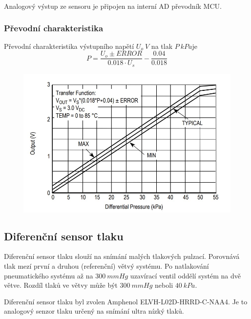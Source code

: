 \documentclass{ctuthesis}
\begin{document}
Analogový výstup ze sensoru je připojen na interní AD převodník MCU. 

\subsubsection{Převodní charakteristika}
Převodní charakteristika výstupního napětí $U_{o} \ V$ na tlak $P \ kPa$je 
\begin{equation}
    P = \frac{U_o \pm ERROR}{0.018 \cdot U_s} - \frac{0.04}{0.018}
    \label{eq:nxp_transfer}
\end{equation}

\begin{figure}[H]
    \centering
    \includegraphics{pictures/nxp_transfer.jpg}
    \caption{}
    \label{fig:nxp_transfer}
\end{figure}


\subsection{Diferenční sensor tlaku}
Diferenční sensor tlaku slouží na snímání malých tlakových pulzací. Porovnává tlak mezí první a druhou (referenční) větvý systému. Po natlakování pneumatického systému až na $300 \ mmHg$ uzavírací ventil oddělí systém na dvě větve. Rozdíl tlaků ve větvy může být $300 \ mmHg$ neboli $40 \ kPa$. \par

Diferenční sensor tlaku byl zvolen Amphenol ELVH-L02D-HRRD-C-NAA4. Je to analogový senzor tlaku určený na snímání ultra nízký tlaků. 
\end{document}
